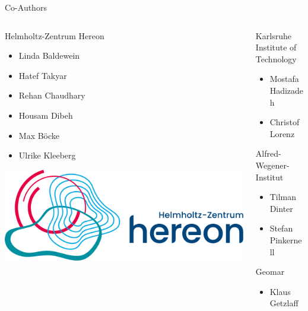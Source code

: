 \begin{frame}{Co-Authors}

	\begin{columns}[T]
		\begin{column}{0.5\linewidth}

			\begin{block}{Helmholtz-Zentrum Hereon}
				\begin{itemize}
					\item Linda Baldewein
					\item Hatef Takyar
					\item Rehan Chaudhary
					\item Housam Dibeh
					\item Max Böcke
					\item Ulrike Kleeberg
				\end{itemize}
				\vspace{1em}
				\qquad \href{https://www.hereon.de}{
					\includegraphics[width=0.4\linewidth]{figures/hereon.png}
				}
			\end{block}
		\end{column}

		\begin{column}{0.5\linewidth}
			\begin{block}{Karlsruhe Institute of Technology}
				\begin{itemize}
					\item Mostafa Hadizadeh
					\item Christof Lorenz
				\end{itemize}
			\end{block}

			\begin{block}{Alfred-Wegener-Institut}
				\begin{itemize}
					\item Tilman Dinter
					\item Stefan Pinkernell
				\end{itemize}
			\end{block}

			\begin{block}{Geomar}
				\begin{itemize}
					\item Klaus Getzlaff
				\end{itemize}
			\end{block}


\end{column}
\end{columns}
\end{frame}
